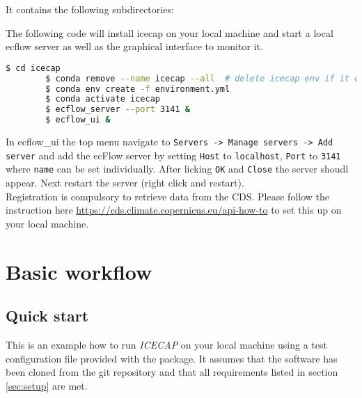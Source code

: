 \documentclass[DIV=10, parskip=full]{scrreprt}
\newcommand{\ice}{\textit{ICECAP}\xspace}
\begin{document}
It contains the following subdirectories:



The following code will install icecap on your local machine and start a local ecflow server as well as the graphical interface to monitor it.\\
	
	\begin{lstlisting}[language=bash, float]
		$ cd icecap
		$ conda remove --name icecap --all  # delete icecap env if it exists
		$ conda env create -f environment.yml 
		$ conda activate icecap
		$ ecflow_server --port 3141 &
		$ ecflow_ui & 
	\end{lstlisting}
	In ecflow\_ui the top menu navigate to \texttt{Servers -> Manage servers -> Add server} and add the ecFlow server by setting \texttt{Host} to \texttt{localhost}, \texttt{Port} to \texttt{3141} where \texttt{name} can be set individually. After licking \texttt{OK} and \texttt{Close} the server shoudl appear. Next restart the server (right click and restart).\\
	
	Registration is compulsory to retrieve data from the CDS. Please follow the instruction here \url{https://cds.climate.copernicus.eu/api-how-to} to set this up on your local machine.


\chapter{Basic workflow}
\section{Quick start} \label{sec:quick_start}
This is an example how to run \ice on your local machine using a test configuration file provided with the package. It assumes that the software has been cloned from the git repository and that all requirements listed in section \ref{sec:setup} are met.
\end{document}
